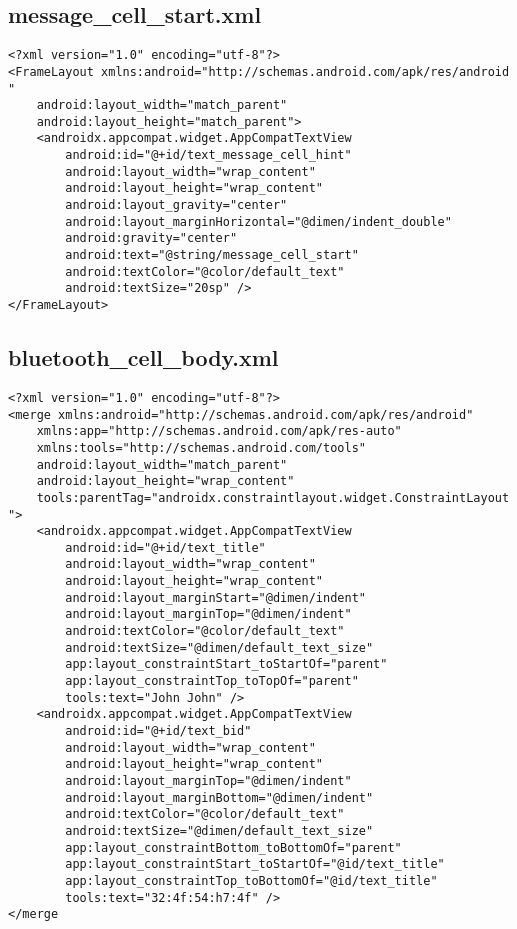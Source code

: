 \documentclass[listing]{espd}
\begin{document}
\subsection{message\_cell\_start.xml}
\begin{verbatim}
<?xml version="1.0" encoding="utf-8"?>
<FrameLayout xmlns:android="http://schemas.android.com/apk/res/android
"
    android:layout_width="match_parent"
    android:layout_height="match_parent">
    <androidx.appcompat.widget.AppCompatTextView
        android:id="@+id/text_message_cell_hint"
        android:layout_width="wrap_content"
        android:layout_height="wrap_content"
        android:layout_gravity="center"
        android:layout_marginHorizontal="@dimen/indent_double"
        android:gravity="center"
        android:text="@string/message_cell_start"
        android:textColor="@color/default_text"
        android:textSize="20sp" />
</FrameLayout>
\end{verbatim}

\subsection{bluetooth\_cell\_body.xml}
\begin{verbatim}
<?xml version="1.0" encoding="utf-8"?>
<merge xmlns:android="http://schemas.android.com/apk/res/android"
    xmlns:app="http://schemas.android.com/apk/res-auto"
    xmlns:tools="http://schemas.android.com/tools"
    android:layout_width="match_parent"
    android:layout_height="wrap_content"
    tools:parentTag="androidx.constraintlayout.widget.ConstraintLayout
">
    <androidx.appcompat.widget.AppCompatTextView
        android:id="@+id/text_title"
        android:layout_width="wrap_content"
        android:layout_height="wrap_content"
        android:layout_marginStart="@dimen/indent"
        android:layout_marginTop="@dimen/indent"
        android:textColor="@color/default_text"
        android:textSize="@dimen/default_text_size"
        app:layout_constraintStart_toStartOf="parent"
        app:layout_constraintTop_toTopOf="parent"
        tools:text="John John" />
    <androidx.appcompat.widget.AppCompatTextView
        android:id="@+id/text_bid"
        android:layout_width="wrap_content"
        android:layout_height="wrap_content"
        android:layout_marginTop="@dimen/indent"
        android:layout_marginBottom="@dimen/indent"
        android:textColor="@color/default_text"
        android:textSize="@dimen/default_text_size"
        app:layout_constraintBottom_toBottomOf="parent"
        app:layout_constraintStart_toStartOf="@id/text_title"
        app:layout_constraintTop_toBottomOf="@id/text_title"
        tools:text="32:4f:54:h7:4f" />
</merge
\end{verbatim}
\end{document}
